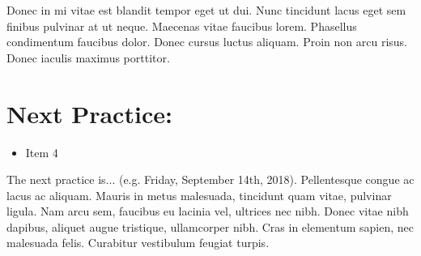 \documentclass[12pt]{article}
\begin{document}
Donec in mi vitae est blandit tempor eget ut dui. Nunc tincidunt lacus eget sem finibus pulvinar at ut neque. Maecenas vitae faucibus lorem. Phasellus condimentum faucibus dolor. Donec cursus luctus aliquam. Proin non arcu risus. Donec iaculis maximus porttitor.

\section{Next Practice:}
\begin{itemize}
	\item Item 4
\end{itemize}

The next practice is... (e.g. Friday, September 14th, 2018). %
Pellentesque congue ac lacus ac aliquam. Mauris in metus malesuada, tincidunt quam vitae, pulvinar ligula. Nam arcu sem, faucibus eu lacinia vel, ultrices nec nibh. Donec vitae nibh dapibus, aliquet augue tristique, ullamcorper nibh. Cras in elementum sapien, nec malesuada felis. Curabitur vestibulum feugiat turpis. 
\end{document}
